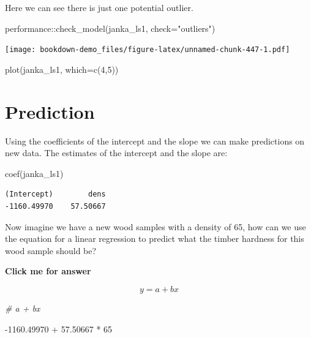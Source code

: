 \documentclass[
]{book}
\newenvironment{Shaded}{\begin{snugshade}}{\end{snugshade}}
\newcommand{\AttributeTok}[1]{\textcolor[rgb]{0.77,0.63,0.00}{#1}}
\newcommand{\CommentTok}[1]{\textcolor[rgb]{0.56,0.35,0.01}{\textit{#1}}}
\newcommand{\DecValTok}[1]{\textcolor[rgb]{0.00,0.00,0.81}{#1}}
\newcommand{\FloatTok}[1]{\textcolor[rgb]{0.00,0.00,0.81}{#1}}
\newcommand{\FunctionTok}[1]{\textcolor[rgb]{0.00,0.00,0.00}{#1}}
\newcommand{\NormalTok}[1]{#1}
\newcommand{\SpecialCharTok}[1]{\textcolor[rgb]{0.00,0.00,0.00}{#1}}
\newcommand{\StringTok}[1]{\textcolor[rgb]{0.31,0.60,0.02}{#1}}
\begin{document}
Here we can see there is just one potential outlier.

\begin{Shaded}
\begin{Highlighting}[]
\NormalTok{performance}\SpecialCharTok{::}\FunctionTok{check\_model}\NormalTok{(janka\_ls1, }\AttributeTok{check=}\StringTok{"outliers"}\NormalTok{)}
\end{Highlighting}
\end{Shaded}

\texttt{[image: bookdown-demo\_files/figure-latex/unnamed-chunk-447-1.pdf]}

\begin{Shaded}
\begin{Highlighting}[]
\FunctionTok{plot}\NormalTok{(janka\_ls1, }\AttributeTok{which=}\FunctionTok{c}\NormalTok{(}\DecValTok{4}\NormalTok{,}\DecValTok{5}\NormalTok{))}
\end{Highlighting}
\end{Shaded}

\hypertarget{prediction}{%
\section{Prediction}\label{prediction}}

Using the coefficients of the intercept and the slope we can make predictions on new data.
The estimates of the intercept and the slope are:

\begin{Shaded}
\begin{Highlighting}[]
\FunctionTok{coef}\NormalTok{(janka\_ls1)}
\end{Highlighting}
\end{Shaded}

\begin{verbatim}
(Intercept)        dens 
-1160.49970    57.50667
\end{verbatim}

Now imagine we have a new wood samples with a density of 65, how can we use the equation for a linear regression to predict what the timber hardness for this wood sample should be?

\textbf{Click me for answer}

\[ y = a + bx \]

\begin{Shaded}
\begin{Highlighting}[]
\CommentTok{\# a + bx}

\SpecialCharTok{{-}}\FloatTok{1160.49970} \SpecialCharTok{+} \FloatTok{57.50667} \SpecialCharTok{*} \DecValTok{65}
\end{Highlighting}
\end{Shaded}
\end{document}

